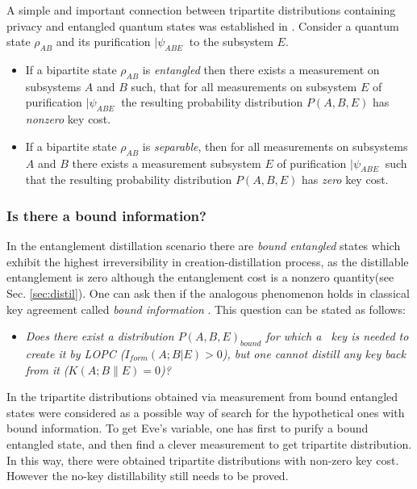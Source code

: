 \documentclass[twocolumn,aps,rmp]{revtex4}
\begin{document}
A simple and important connection between tripartite distributions
containing privacy and entangled quantum states was established in
\cite{GisinAcin_link}. Consider a quantum state $\rho_{AB}$ and its
purification $|\psi_{ABE}\>$ to the subsystem $E$.
\begin{itemize}
\item If a bipartite state $\rho_{AB}$ is {\it entangled} then there exists
a measurement on subsystems $A$ and $B$ such, that for all measurements on subsystem $E$ of purification $|\psi_{ABE}\>$ the resulting probability distribution
$P(A,B,E)$ has {\it nonzero} key cost.
\item If a bipartite state $\rho_{AB}$ is {\it separable}, then for all measurements on subsystems $A$ and $B$ there exists a measurement subsystem $E$ of purification $|\psi_{ABE}\>$ such that the resulting probability distribution $P(A,B,E)$ has {\it zero} key cost.
\end{itemize}

\subsubsection{Is there a bound information?}
In the entanglement distillation scenario there are {\it bound
entangled} states which exhibit the highest irreversibility in
creation-distillation process, as the distillable entanglement is
zero although the entanglement cost is a nonzero quantity(see
Sec. \ref{sec:distil}). One can ask then if the analogous
phenomenon holds in classical key agreement called {\it bound
information} \cite{GisinWolf_linking,renner-wolf-gap}. This question
can be stated as follows:

\begin{itemize}
\item{\it Does there exist a distribution $P(A,B,E)_{bound}$ for which a \secure\ key is needed to create it by LOPC ($I_{form}(A;B|E)>0$), but one cannot distill any key back
from it ($K(A;B\|E)=0$)?}
\end{itemize}




In \cite{GisinWolf_linking} the tripartite distributions obtained
via measurement from bound entangled states were considered as a
possible way of search for the hypothetical ones  with bound
information. To get Eve's variable, one has first to purify a bound
entangled state, and then find a clever measurement to get
tripartite distribution. In this way, there were obtained tripartite
distributions with non-zero key cost. However the no-key
distillability still needs to be proved.
\end{document}
